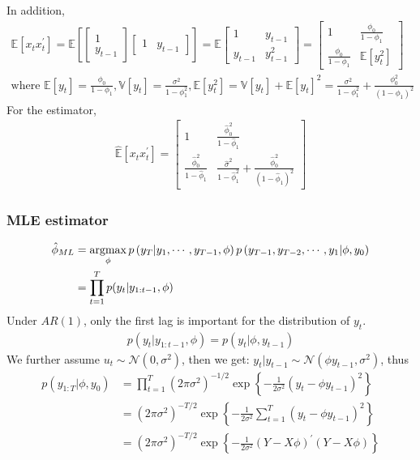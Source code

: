 In addition,
\begin{gather*}
    \mathbb{E}[x_t x_t^{\prime}] = \mathbb{E}\left[ \begin{bmatrix}
        1 \\
        y_{t-1}
    \end{bmatrix} \begin{bmatrix}
        1 & y_{t-1} 
    \end{bmatrix} \right] = \mathbb{E} \begin{bmatrix}
        1 & y_{t-1} \\
        y_{t-1} & y_{t-1}^2
    \end{bmatrix} = \begin{bmatrix}
        1 & \frac{\phi_0}{1 - \phi_1} \\
        \frac{\phi_0}{1 - \phi_1} & \mathbb{E}[y_t^2]
    \end{bmatrix} \\
    \text{where } \mathbb{E}[y_t] = \frac{\phi_0}{1 - \phi_1} , \mathbb{V}[y_t] = \frac{\sigma^2}{1 - \phi_1^2}, \mathbb{E}[y_t^2] = \mathbb{V}[y_t] + \mathbb{E}[y_t]^2 = \frac{\sigma^2}{1 - \phi_1^2} + \frac{\phi_0^2}{(1 - \phi_1)^2}
\end{gather*}
For the estimator, 
\begin{gather*}
    \hat{\mathbb{E}}[x_t x_t^{\prime}] = \begin{bmatrix}
        1 & \frac{\hat{\phi}_0^2}{1 - \hat{\phi}_1} \\
        \frac{\hat{\phi}_0^2}{1 - \hat{\phi}_1} & \frac{\hat{\sigma}^2}{1 - \hat{\phi}_1^2} + \frac{\hat{\phi}_0^2}{(1 - \hat{\phi}_1)^2}
    \end{bmatrix}
\end{gather*}

\subsubsection{MLE estimator}
\begin{align*}
    \hat{\phi}_{ML} &= \operatorname*{arg max}_{\phi} p\left( y_T | y_1, \cdots, y_{T-1}, \phi \right) p\left( y_{T-1}, y_{T-2}, \cdots, y_1 | \phi, y_0 \right) \\
    &= \prod_{t=1}^{T} p(y_t | y_{1:t-1}, \phi)
\end{align*}
Under $AR(1)$, only the first lag is important for the distribution of $y_t$.
\begin{gather*}
    p(y_t | y_{1:t-1}, \phi) = p(y_t | \phi, y_{t-1})
\end{gather*}
We further assume $u_t \sim \mathcal{N} (0, \sigma^2)$, then we get: $y_t | y_{t-1} \sim \mathcal{N} (\phi y_{t-1}, \sigma^2)$, thus
\begin{align*}
    p(y_{1:T} | \phi, y_0) &= \prod_{t=1}^{T}(2 \pi \sigma^2)^{-1/2} \exp\left\{-\frac{1}{2 \sigma^2} (y_t - \phi y_{t-1})^2\right\} \\
    &= (2 \pi \sigma^2)^{-T/2} \exp\left\{-\frac{1}{2 \sigma^2} \sum_{t=1}^{T} (y_t - \phi y_{t-1})^2\right\} \\
    &= (2 \pi \sigma^2)^{-T/2} \exp\left\{-\frac{1}{2 \sigma^2} (Y - X \phi)^{\prime} (Y - X \phi) \right\}
\end{align*}

